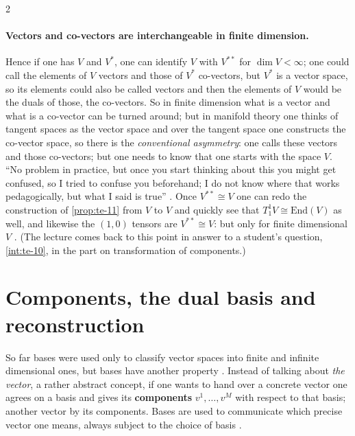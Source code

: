 \begin{paracol}{2}
\paragraph{Vectors and co-vectors are interchangeable in finite dimension.} Hence if one has $V$ and $V^*$, one can identify $V$ with $V^{**}$ for $\dim V<\infty$; one could call the elements of $V$ vectors and those of $V^*$ co-vectors, but $V^*$ is a vector space, so its elements could also be called vectors
and then the elements of $V$ would be the duals of those, the co-vectors. So in finite dimension what is a vector and what is a co-vector can be turned around; but in manifold theory one thinks of tangent spaces as the vector space and over the tangent space one constructs the co-vector space, so there is
the \emph{conventional asymmetry}: one calls these vectors and those co-vectors; but one needs to know that one starts with the space $V$. ``No problem in practice, but once you start thinking about this you might get confused, so I tried to confuse you beforehand; I do not know where
that works pedagogically, but what I said is true'' .
Once $V^{**}\cong V$ one can redo the construction of \cref{prop:te-11} from $V$ to $V$ and quickly see that $T^1_1V\cong\mathrm{End}(V)$ as well, and likewise the $(1,0)$ tensors are $V^{**}\cong V$: but only for finite dimensional $V$ .
(The lecture comes back to this point in answer to a student's question, \cref{int:te-10}, in the part on transformation of components.)

\section{Components, the dual basis and reconstruction}\label{sec:te-components}

So far bases were used only to classify vector spaces into finite and infinite dimensional ones, but bases have another property . Instead of talking about \emph{the vector}, a rather abstract concept, if one wants to hand over a concrete vector one agrees on a basis and gives its
\textbf{components} $v^1,\dots,v^M$ with respect to that basis; another vector by its components. Bases are used to communicate which precise vector one means, always subject to the choice of basis .


\end{paracol}
